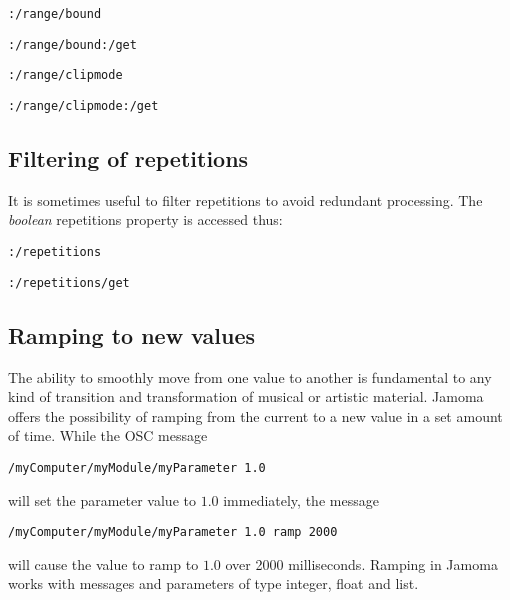 \documentclass{NIME-alternate}
\begin{document}
\texttt{:/range/bound}

\texttt{:/range/bound:/get}

\texttt{:/range/clipmode}

\texttt{:/range/clipmode:/get}





\subsection{Filtering of repetitions} %
\label{sub:filtering_of_repetitions}

It is sometimes useful to filter repetitions to avoid redundant processing. The \emph{boolean} repetitions property is accessed thus:

\texttt{:/repetitions}

\texttt{:/repetitions/get}





\subsection{Ramping to new values} %
\label{sub:ramping_to_new_values}

The ability to smoothly move from one value to another is fundamental to any kind of transition and transformation of musical or artistic material. Jamoma offers the possibility of ramping from the current to a new value in a set amount of time. While the OSC message

\texttt{/myComputer/myModule/myParameter 1.0}

\noindent
will set the parameter value to $1.0$ immediately, the message

\texttt{/myComputer/myModule/myParameter 1.0 ramp 2000}

\noindent
will cause the value to ramp to $1.0$ over 2000 milliseconds. Ramping in Jamoma works with messages and parameters of type integer, float and list.
\end{document}
